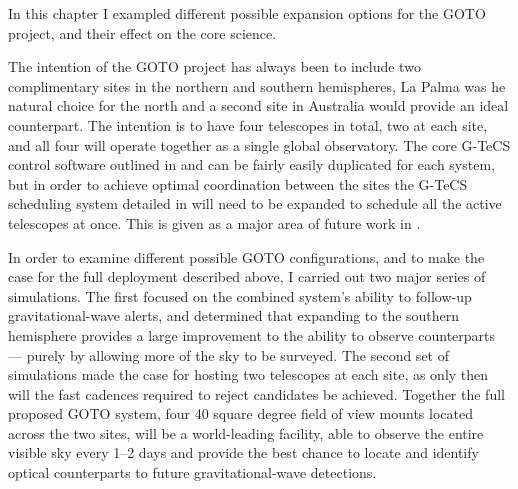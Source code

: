 \begin{colsection}

In this chapter I exampled different possible expansion options for the GOTO project, and their effect on the core science.

The intention of the GOTO project has always been to include two complimentary sites in the northern and southern hemispheres, La Palma was he natural choice for the north and a second site in Australia would provide an ideal counterpart. The intention is to have four telescopes in total, two at each site, and all four will operate together as a single global observatory. The core G-TeCS control software outlined in  and  can be fairly easily duplicated for each system, but in order to achieve optimal coordination between the sites the G-TeCS scheduling system detailed in  will need to be expanded to schedule all the active telescopes at once. This is given as a major area of future work in .

In order to examine different possible GOTO configurations, and to make the case for the full deployment described above, I carried out two major series of simulations. The first focused on the combined system's ability to follow-up gravitational-wave alerts, and determined that expanding to the southern hemisphere provides a large improvement to the ability to observe counterparts --- purely by allowing more of the sky to be surveyed. The second set of simulations made the case for hosting two telescopes at each site, as only then will the fast cadences required to reject candidates be achieved. Together the full proposed GOTO system, four 40 square degree field of view mounts located across the two sites, will be a world-leading facility, able to observe the entire visible sky every 1--2 days and provide the best chance to locate and identify optical counterparts to future gravitational-wave detections.

\end{colsection}

